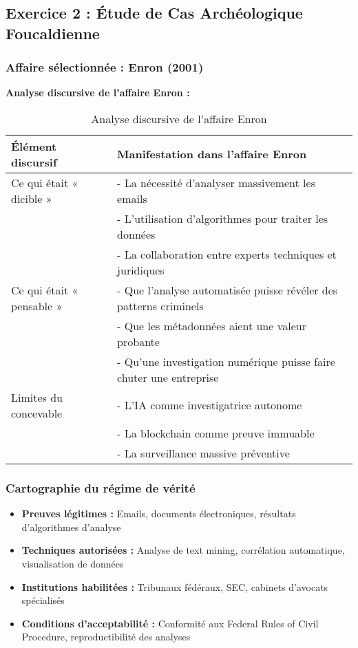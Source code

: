 \documentclass[12pt,a4paper]{article}
\begin{document}
\subsection{Exercice 2 : Étude de Cas Archéologique Foucaldienne}

\subsubsection{Affaire sélectionnée : Enron (2001)}

\textbf{Analyse discursive de l'affaire Enron :}

\begin{table}[H]
\centering
\begin{tabular}{|p{}|p{}|}
\hline
\textbf{Élément discursif} & \textbf{Manifestation dans l'affaire Enron} \\
\hline
Ce qui était « dicible » & - La nécessité d'analyser massivement les emails\\
& - L'utilisation d'algorithmes pour traiter les données\\
& - La collaboration entre experts techniques et juridiques\\
\hline
Ce qui était « pensable » & - Que l'analyse automatisée puisse révéler des patterns criminels\\
& - Que les métadonnées aient une valeur probante\\
& - Qu'une investigation numérique puisse faire chuter une entreprise\\
\hline
Limites du concevable & - L'IA comme investigatrice autonome\\
& - La blockchain comme preuve immuable\\
& - La surveillance massive préventive\\
\hline
\end{tabular}
\caption{Analyse discursive de l'affaire Enron}
\end{table}

\subsubsection{Cartographie du régime de vérité}

\begin{itemize}
\item \textbf{Preuves légitimes :} Emails, documents électroniques, résultats d'algorithmes d'analyse
\item \textbf{Techniques autorisées :} Analyse de text mining, corrélation automatique, visualisation de données
\item \textbf{Institutions habilitées :} Tribunaux fédéraux, SEC, cabinets d'avocats spécialisés
\item \textbf{Conditions d'acceptabilité :} Conformité aux Federal Rules of Civil Procedure, reproductibilité des analyses
\end{itemize}
\end{document}
